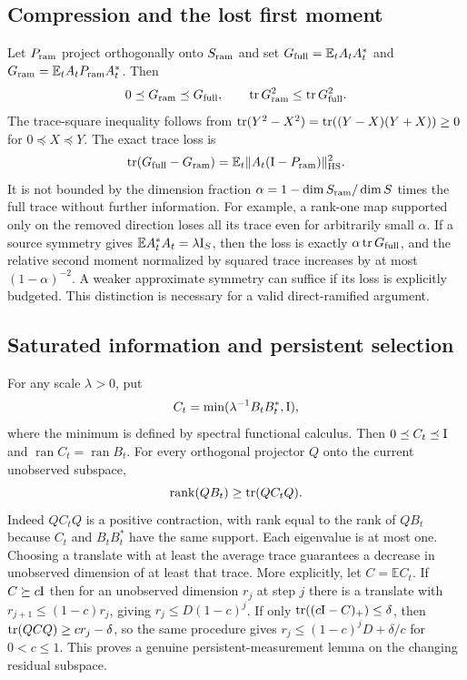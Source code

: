 \documentclass[11pt,a4paper]{article}
\begin{document}
\subsection{Compression and the lost first moment}
Let $P_{\rm ram}$ project orthogonally onto $S_{\rm ram}$ and set $G_{\rm full}=\mathbb E_t A_tA_t^*$ and $G_{\rm ram}=\mathbb E_t A_tP_{\rm ram}A_t^*$. Then
\begin{equation}\label{eq:compress}
0\preceq G_{\rm ram}\preceq G_{\rm full},\qquad \operatorname{tr} G_{\rm ram}^2\leq\operatorname{tr} G_{\rm full}^2.
\end{equation}
The trace-square inequality follows from $\operatorname{tr}(Y^2-X^2)=\operatorname{tr}((Y-X)(Y+X))\geq0$ for $0\preceq X\preceq Y$. The exact trace loss is
\begin{equation}\label{eq:traceloss}
\operatorname{tr}(G_{\rm full}-G_{\rm ram})=\mathbb E_t\|A_t(\mathrm I-P_{\rm ram})\|_{\rm HS}^2.
\end{equation}
It is not bounded by the dimension fraction $\alpha=1-\dim S_{\rm ram}/\dim S$ times the full trace without further information. For example, a rank-one map supported only on the removed direction loses all its trace even for arbitrarily small $\alpha$. If a source symmetry gives $\mathbb E A_t^*A_t=\lambda\mathrm I_S$, then the loss is exactly $\alpha\operatorname{tr} G_{\rm full}$, and the relative second moment normalized by squared trace increases by at most $(1-\alpha)^{-2}$. A weaker approximate symmetry can suffice if its loss is explicitly budgeted. This distinction is necessary for a valid direct-ramified argument.

\subsection{Saturated information and persistent selection}
For any scale $\lambda>0$, put
\begin{equation}\label{eq:saturation}
C_t=\min(\lambda^{-1}B_tB_t^*,\mathrm I),
\end{equation}
where the minimum is defined by spectral functional calculus. Then $0\preceq C_t\preceq\mathrm I$ and $\operatorname{ran}C_t=\operatorname{ran}B_t$. For every orthogonal projector $Q$ onto the current unobserved subspace,
\begin{equation}\label{eq:rankinfo}
\operatorname{rank}(QB_t)\geq\operatorname{tr}(QC_tQ).
\end{equation}
Indeed $QC_tQ$ is a positive contraction, with rank equal to the rank of $QB_t$ because $C_t$ and $B_tB_t^*$ have the same support. Each eigenvalue is at most one. Choosing a translate with at least the average trace guarantees a decrease in unobserved dimension of at least that trace. More explicitly, let $C=\mathbb E C_t$. If $C\succeq c\mathrm I$ then for an unobserved dimension $r_j$ at step $j$ there is a translate with $r_{j+1}\leq(1-c)r_j$, giving $r_j\leq D(1-c)^j$. If only $\operatorname{tr}((c\mathrm I-C)_+)\leq\delta$, then $\operatorname{tr}(QCQ)\geq cr_j-\delta$, so the same procedure gives $r_j\leq (1-c)^jD+\delta/c$ for $0<c\leq1$. This proves a genuine persistent-measurement lemma on the changing residual subspace.
\end{document}
